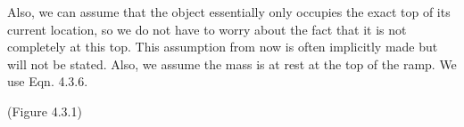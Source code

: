 Also, we can assume that the object essentially only occupies the exact top of its current location, so we do not have to worry about the fact that it is not completely at this top. This assumption from now is often implicitly made but will not be stated. Also, we assume the mass is at rest at the top of the ramp. We use Eqn. 4.3.6. 
\newline
{}
\newline
\begin{center}
(Figure 4.3.1)
\end{center}
